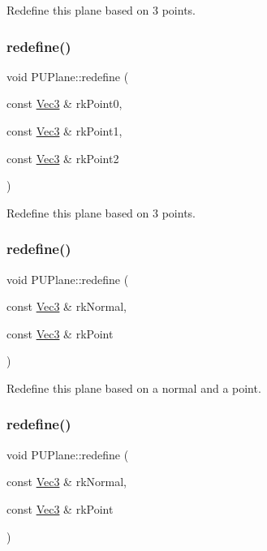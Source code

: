 Redefine this plane based on 3 points. \mbox{\label{classPUPlane_ab5f749af7164a88b60533ab92f93456f}} 
\subsubsection{\texorpdfstring{redefine()}{redefine()}\hspace{0.1cm}{\footnotesize\ttfamily [2/4]}}
{\footnotesize\ttfamily void P\+U\+Plane\+::redefine (\begin{DoxyParamCaption}\item[{const \hyperlink{classVec3}{Vec3} \&}]{rk\+Point0,  }\item[{const \hyperlink{classVec3}{Vec3} \&}]{rk\+Point1,  }\item[{const \hyperlink{classVec3}{Vec3} \&}]{rk\+Point2 }\end{DoxyParamCaption})}

Redefine this plane based on 3 points. \mbox{\label{classPUPlane_a28e4eb42319176fc722d461c7bbf882b}} 
\subsubsection{\texorpdfstring{redefine()}{redefine()}\hspace{0.1cm}{\footnotesize\ttfamily [3/4]}}
{\footnotesize\ttfamily void P\+U\+Plane\+::redefine (\begin{DoxyParamCaption}\item[{const \hyperlink{classVec3}{Vec3} \&}]{rk\+Normal,  }\item[{const \hyperlink{classVec3}{Vec3} \&}]{rk\+Point }\end{DoxyParamCaption})}

Redefine this plane based on a normal and a point. \mbox{\label{classPUPlane_a28e4eb42319176fc722d461c7bbf882b}} 
\subsubsection{\texorpdfstring{redefine()}{redefine()}\hspace{0.1cm}{\footnotesize\ttfamily [4/4]}}
{\footnotesize\ttfamily void P\+U\+Plane\+::redefine (\begin{DoxyParamCaption}\item[{const \hyperlink{classVec3}{Vec3} \&}]{rk\+Normal,  }\item[{const \hyperlink{classVec3}{Vec3} \&}]{rk\+Point }\end{DoxyParamCaption})}


